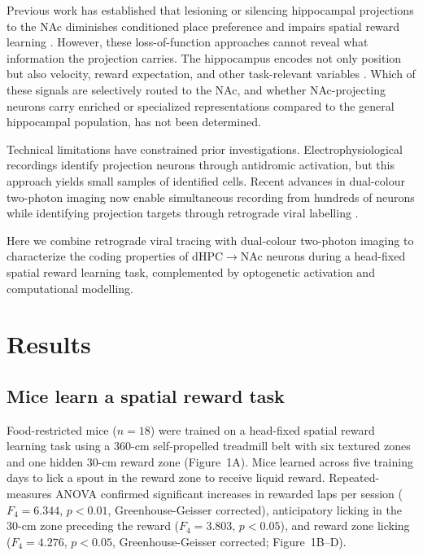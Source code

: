 \documentclass[11pt]{article}
\begin{document}
Previous work has established that lesioning or silencing hippocampal projections to the NAc diminishes conditioned place preference and impairs spatial reward learning \citep{britt2012synaptic,lefort2019hippocampal}. However, these loss-of-function approaches cannot reveal what information the projection carries. The hippocampus encodes not only position but also velocity, reward expectation, and other task-relevant variables \citep{mcnaughton2006path,gauthier2018dedicated}. Which of these signals are selectively routed to the NAc, and whether NAc-projecting neurons carry enriched or specialized representations compared to the general hippocampal population, has not been determined.

Technical limitations have constrained prior investigations. Electrophysiological recordings identify projection neurons through antidromic activation, but this approach yields small samples of identified cells. Recent advances in dual-colour two-photon imaging now enable simultaneous recording from hundreds of neurons while identifying projection targets through retrograde viral labelling \citep{chen2013ultrasensitive,dana2019high}.

Here we combine retrograde viral tracing with dual-colour two-photon imaging to characterize the coding properties of dHPC$\to$NAc neurons during a head-fixed spatial reward learning task, complemented by optogenetic activation and computational modelling.

\section{Results}

\subsection{Mice learn a spatial reward task}

Food-restricted mice ($n = 18$) were trained on a head-fixed spatial reward learning task using a 360-cm self-propelled treadmill belt with six textured zones and one hidden 30-cm reward zone (Figure~1A). Mice learned across five training days to lick a spout in the reward zone to receive liquid reward. Repeated-measures ANOVA confirmed significant increases in rewarded laps per session ($F_{4} = 6.344$, $p < 0.01$, Greenhouse-Geisser corrected), anticipatory licking in the 30-cm zone preceding the reward ($F_{4} = 3.803$, $p < 0.05$), and reward zone licking ($F_{4} = 4.276$, $p < 0.05$, Greenhouse-Geisser corrected; Figure~1B--D).
\end{document}

